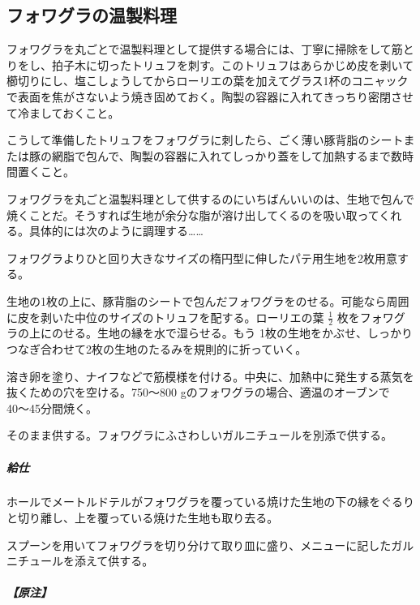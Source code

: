 

\hypertarget{preparations-chaudes-du-foie-gras}{%
\subsection{フォワグラの温製料理}\label{preparations-chaudes-du-foie-gras}}


フォワグラを丸ごとで温製料理として提供する場合には、丁寧に掃除をして筋とりをし、拍子木に切ったトリュフを刺す。このトリュフはあらかじめ皮を剥いて櫛切りにし、塩こしょうしてからローリエの葉を加えてグラス1杯のコニャックで表面を焦がさないよう焼き固めておく。陶製の容器に入れてきっちり密閉させて冷ましておくこと。

こうして準備したトリュフをフォワグラに刺したら、ごく薄い豚背脂のシートまたは豚の網脂で包んで、陶製の容器に入れてしっかり蓋をして加熱するまで数時間置くこと。

フォワグラを丸ごと温製料理として供するのにいちばんいいのは、生地で包んで焼くことだ。そうすれば生地が余分な脂が溶け出してくるのを吸い取ってくれる。具体的には次のように調理する\ldots{}\ldots{}

フォワグラよりひと回り大きなサイズの楕円型に伸したパテ用生地を2枚用意する。

生地の1枚の上に、豚背脂のシートで包んだフォワグラをのせる。可能なら周囲に皮を剥いた中位のサイズのトリュフを配する。ローリエの葉
\(\frac{1}{2}\) 枚をフォワグラの上にのせる。生地の縁を水で湿らせる。もう
1枚の生地をかぶせ、しっかりつなぎ合わせて2枚の生地のたるみを規則的に折っていく。

溶き卵を塗り、ナイフなどで筋模様を付ける。中央に、加熱中に発生する蒸気を抜くための穴を空ける。750〜800
gのフォワグラの場合、適温のオーブンで 40〜45分間焼く。

そのまま供する。フォワグラにふさわしいガルニチュールを別添で供する。

\hypertarget{service-des-preparations-chaudes-du-foie-gras}{%
\subparagraph{給仕}\label{service-des-preparations-chaudes-du-foie-gras}}

ホールでメートルドテルがフォワグラを覆っている焼けた生地の下の縁をぐるりと切り離し、上を覆っている焼けた生地も取り去る。

スプーンを用いてフォワグラを切り分けて取り皿に盛り、メニューに記したガルニチュールを添えて供する。

\hypertarget{nota-preparations-chaudes-du-foie-gras}{%
\subparagraph{【原注】}\label{nota-preparations-chaudes-du-foie-gras}}

